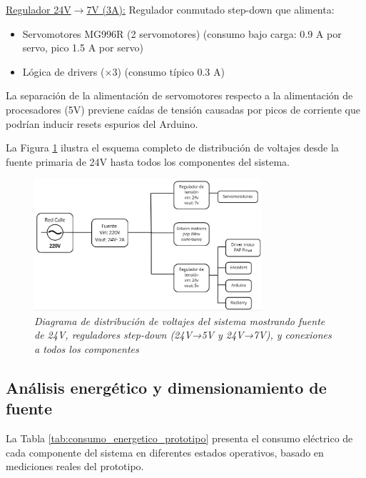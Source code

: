 \underline{Regulador 24V$\rightarrow$7V (3A):} Regulador conmutado step-down que alimenta:
\begin{itemize}[label=$\bullet$]
\item Servomotores MG996R (2 servomotores) (consumo bajo carga: 0.9 A por servo, pico 1.5 A por servo)
\item Lógica de drivers ($\times$3) (consumo típico 0.3 A)
\end{itemize}

La separación de la alimentación de servomotores respecto a la alimentación de procesadores (5V) previene caídas de tensión causadas por picos de corriente que podrían inducir resets espurios del Arduino.

La Figura \ref{fig:diagrama_voltajes} ilustra el esquema completo de distribución de voltajes desde la fuente primaria de 24V hasta todos los componentes del sistema.

\begin{figure}[H]
\centering
\includegraphics[width=0.75\textwidth]{imagenes/diagrama_voltajes.jpg}
\caption{\textit{Diagrama de distribución de voltajes del sistema mostrando fuente de 24V, reguladores step-down (24V→5V y 24V→7V), y conexiones a todos los componentes}}
\label{fig:diagrama_voltajes}
\end{figure}

\subsection{Análisis energético y dimensionamiento de fuente}

La Tabla \ref{tab:consumo_energetico_prototipo} presenta el consumo eléctrico de cada componente del sistema en diferentes estados operativos, basado en mediciones reales del prototipo.

